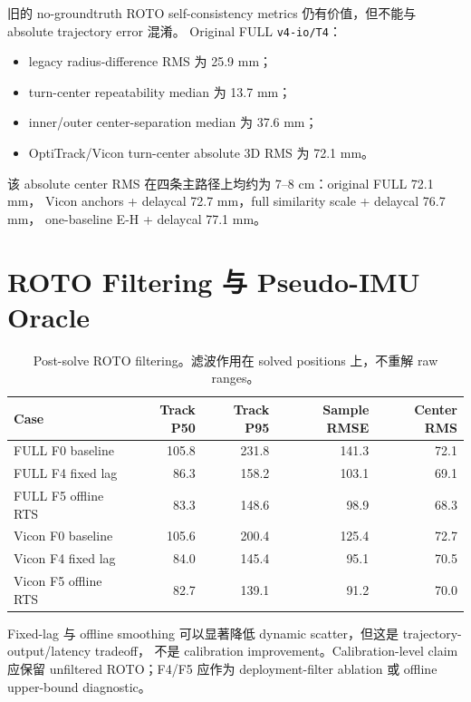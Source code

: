 \documentclass[UTF8,11pt,a4paper]{ctexart}
\newcommand{\case}[1]{\texttt{#1}}
\newcommand{\tight}{\setlength{\tabcolsep}{4pt}\renewcommand{\arraystretch}{1.12}}
\begin{document}
旧的 no-groundtruth ROTO self-consistency metrics 仍有价值，但不能与 absolute trajectory error 混淆。
Original FULL \case{v4-io/T4}：
\begin{itemize}
    \item legacy radius-difference RMS 为 25.9 mm；
    \item turn-center repeatability median 为 13.7 mm；
    \item inner/outer center-separation median 为 37.6 mm；
    \item OptiTrack/Vicon turn-center absolute 3D RMS 为 72.1 mm。
\end{itemize}
该 absolute center RMS 在四条主路径上均约为 7--8 cm：original FULL 72.1 mm，
Vicon anchors + delaycal 72.7 mm，full similarity scale + delaycal 76.7 mm，
one-baseline E-H + delaycal 77.1 mm。

\section{ROTO Filtering 与 Pseudo-IMU Oracle}

\begin{table}[H]
\centering
\tight
\caption{Post-solve ROTO filtering。滤波作用在 solved positions 上，不重解 raw ranges。}
\begin{tabular}{lrrrr}
\toprule
Case & Track P50 & Track P95 & Sample RMSE & Center RMS \\
\midrule
FULL F0 baseline & 105.8 & 231.8 & 141.3 & 72.1 \\
FULL F4 fixed lag & 86.3 & 158.2 & 103.1 & 69.1 \\
FULL F5 offline RTS & 83.3 & 148.6 & 98.9 & 68.3 \\
Vicon F0 baseline & 105.6 & 200.4 & 125.4 & 72.7 \\
Vicon F4 fixed lag & 84.0 & 145.4 & 95.1 & 70.5 \\
Vicon F5 offline RTS & 82.7 & 139.1 & 91.2 & 70.0 \\
\bottomrule
\end{tabular}
\end{table}

Fixed-lag 与 offline smoothing 可以显著降低 dynamic scatter，但这是 trajectory-output/latency tradeoff，
不是 calibration improvement。Calibration-level claim 应保留 unfiltered ROTO；F4/F5 应作为
deployment-filter ablation 或 offline upper-bound diagnostic。
\end{document}
